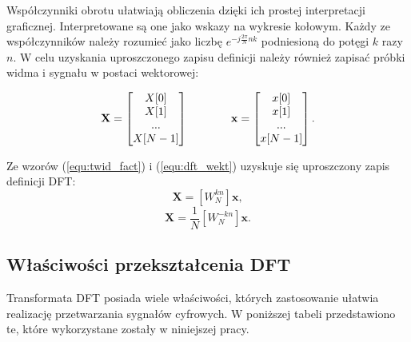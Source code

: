 Współczynniki obrotu ułatwiają obliczenia dzięki ich prostej interpretacji graficznej. Interpretowane są one jako wskazy na wykresie kołowym. Każdy ze współczynników należy rozumieć jako liczbę $e^{-j\frac{2\pi}{N}nk}$ podniesioną do potęgi $k$ razy $n$. W celu uzyskania uproszczonego zapisu definicji należy również zapisać próbki widma i sygnału w postaci wektorowej:

\begin{equation} \label{equ:dft_wekt}
\openup\jot
\begin{aligned}[t]
\mathbf{X} = 
\begin{bmatrix} 
X[0] \\ X[1] \\ ... \\ X[N-1]
\end{bmatrix}
\end{aligned}
\qquad\qquad %
\begin{aligned}[t]
\mathbf{x} =  
\begin{bmatrix} 
x[0] \\ x[1] \\ ... \\ x[N-1]
\end{bmatrix}.
\end{aligned}
\end{equation}

Ze wzorów (\ref{equ:twid_fact}) i (\ref{equ:dft_wekt}) uzyskuje się uproszczony zapis definicji DFT:
\begin{equation} \label{equ:dft_upr}
	\mathbf{X} = [W_{N}^{kn}]\mathbf{x},
\end{equation}
\begin{equation} \label{equ:idft_upr}
\mathbf{X} = \frac{1}{N}[W_{N}^{-kn}]\mathbf{x}.
\end{equation}

\subsection{Właściwości przekształcenia DFT}
Transformata DFT posiada wiele właściwości, których zastosowanie ułatwia realizację przetwarzania sygnałów cyfrowych. W poniższej tabeli przedstawiono te, które wykorzystane zostały w niniejszej pracy.

